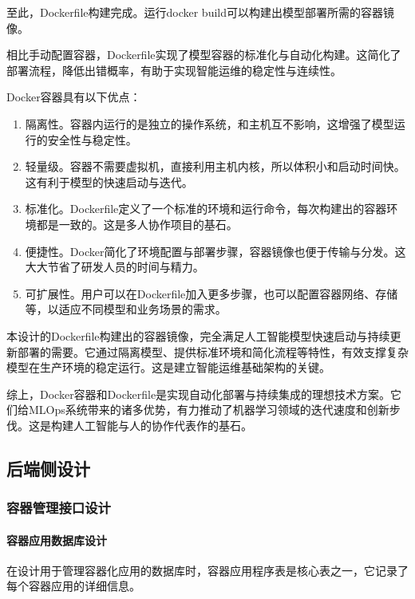 \documentclass{HDU-Bachelor-Thesis}
\begin{document}
至此，Dockerfile构建完成。运行docker build可以构建出模型部署所需的容器镜像。

相比手动配置容器，Dockerfile实现了模型容器的标准化与自动化构建。这简化了部署流程，降低出错概率，有助于实现智能运维的稳定性与连续性。

Docker容器具有以下优点：

\begin{enumerate}   
    \item 隔离性。容器内运行的是独立的操作系统，和主机互不影响，这增强了模型运行的安全性与稳定性。
    \item 轻量级。容器不需要虚拟机，直接利用主机内核，所以体积小和启动时间快。这有利于模型的快速启动与迭代。
    \item 标准化。Dockerfile定义了一个标准的环境和运行命令，每次构建出的容器环境都是一致的。这是多人协作项目的基石。 
    \item 便捷性。Docker简化了环境配置与部署步骤，容器镜像也便于传输与分发。这大大节省了研发人员的时间与精力。
    \item 可扩展性。用户可以在Dockerfile加入更多步骤，也可以配置容器网络、存储等，以适应不同模型和业务场景的需求。  
\end{enumerate}

本设计的Dockerfile构建出的容器镜像，完全满足人工智能模型快速启动与持续更新部署的需要。它通过隔离模型、提供标准环境和简化流程等特性，有效支撑复杂模型在生产环境的稳定运行。这是建立智能运维基础架构的关键。

综上，Docker容器和Dockerfile是实现自动化部署与持续集成的理想技术方案。它们给MLOps系统带来的诸多优势，有力推动了机器学习领域的迭代速度和创新步伐。这是构建人工智能与人的协作代表作的基石。

\subsection{后端侧设计}
\subsubsection{容器管理接口设计}
\paragraph{容器应用数据库设计}

在设计用于管理容器化应用的数据库时，容器应用程序表是核心表之一，它记录了每个容器应用的详细信息。
\end{document}

